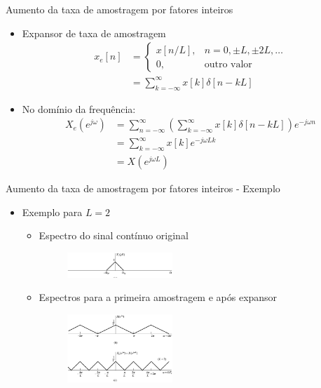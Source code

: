 \begin{slide}{Aumento da taxa de amostragem por fatores inteiros}
	\begin{itemize}
		\item Expansor de taxa de amostragem 
			\begin{align*}
				x_e[n] &= 
				\begin{cases}
					x[n/L],  & n= 0, \pm L, \pm 2L, \dots\\
					0, &\text{outro valor}
				\end{cases}\\
				&= \sum_{k=-\infty}^{\infty}x[k]\delta[n-kL]
			\end{align*}
		\item No domínio da frequência:
			\begin{align*}
				X_e(e^{j\omega})& = \sum_{n=-\infty}^{\infty}\left ( \sum_{k=-\infty}^{\infty}x[k]\delta[n-kL] \right ) e^{-j\omega n}\\
				 &=  \sum_{k=-\infty}^{\infty}x[k] e^{-j\omega L k}\\
				 &=  X(e^{j\omega L})
			\end{align*}
	\end{itemize}
\end{slide}

\begin{slide}{Aumento da taxa de amostragem por fatores inteiros - Exemplo}
	\begin{itemize}
		\item Exemplo para $L=2$
			\begin{itemize}
				\item Espectro do sinal contínuo original
			\begin{figure}
				\centering
				\includegraphics[width=0.4\textwidth]{figs/4-20a.eps}
		        \end{figure}
		\item Espectros para a primeira amostragem e após expansor
			\begin{figure}
				\centering
				\includegraphics[width=0.4\textwidth]{figs/4-24bc.eps}
		        \end{figure}
			\end{itemize}
	\end{itemize}
\end{slide}

